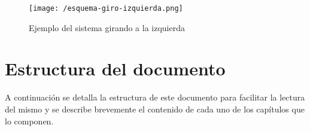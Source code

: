 \begin{figure}[!h]
  \begin{center}
    \texttt{[image: /esquema-giro-izquierda.png]}
    \caption{Ejemplo del sistema girando a la izquierda}
    \label{fig:giroIzquierda}
  \end{center}
\end{figure}


\section{Estructura del documento}

A continuación se detalla la estructura de este documento para facilitar la lectura del mismo y
se describe brevemente el contenido de cada uno de los capítulos que lo componen.


